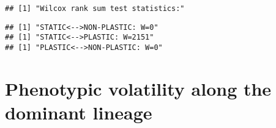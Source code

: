 \documentclass[]{book}
\newenvironment{Shaded}{\begin{snugshade}}{\end{snugshade}}
\newcommand{\ControlFlowTok}[1]{\textcolor[rgb]{0.13,0.29,0.53}{\textbf{#1}}}
\newcommand{\DataTypeTok}[1]{\textcolor[rgb]{0.13,0.29,0.53}{#1}}
\newcommand{\DecValTok}[1]{\textcolor[rgb]{0.00,0.00,0.81}{#1}}
\newcommand{\KeywordTok}[1]{\textcolor[rgb]{0.13,0.29,0.53}{\textbf{#1}}}
\newcommand{\NormalTok}[1]{#1}
\newcommand{\OperatorTok}[1]{\textcolor[rgb]{0.81,0.36,0.00}{\textbf{#1}}}
\newcommand{\OtherTok}[1]{\textcolor[rgb]{0.56,0.35,0.01}{#1}}
\newcommand{\StringTok}[1]{\textcolor[rgb]{0.31,0.60,0.02}{#1}}
\begin{document}
\begin{verbatim}
## [1] "Wilcox rank sum test statistics:"
\end{verbatim}

\begin{Shaded}
\end{Shaded}

\begin{verbatim}
## [1] "STATIC<-->NON-PLASTIC: W=0"
## [1] "STATIC<-->PLASTIC: W=2151"
## [1] "PLASTIC<-->NON-PLASTIC: W=0"
\end{verbatim}

\hypertarget{phenotypic-volatility-along-the-dominant-lineage}{%
\section{Phenotypic volatility along the dominant lineage}\label{phenotypic-volatility-along-the-dominant-lineage}}
\end{document}
